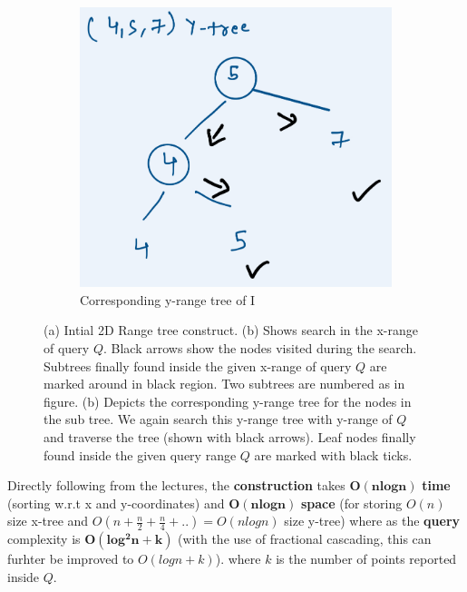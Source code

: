 \begin{figure}[H]
     \begin{subfigure}[b]{0.5\textwidth}
         \centering
         \includegraphics[width=\textwidth]{Images/yfin.jpg}
         \caption{Corresponding y-range tree of I}
         \label{fig:2dy}
     \end{subfigure}
        \caption{(a) Intial 2D Range tree construct. (b) Shows search in the x-range of query $Q$. Black arrows show the nodes visited during the search. Subtrees finally found inside the given x-range of query $Q$ are marked around in black region. Two subtrees are numbered as in figure. (b) Depicts the corresponding y-range tree for the nodes in the sub tree. We again search this y-range tree with y-range of $Q$ and traverse the tree (shown with black arrows).  Leaf nodes finally found inside the given query range $Q$ are marked with black ticks.}
        \label{fig:three graphs}
\end{figure}

Directly following from the lectures, the \textbf{construction} takes $\bm{O(nlogn)}$ \textbf{time} (sorting w.r.t x and y-coordinates) and $\bm{O(nlogn)}$ \textbf{space} (for storing $O(n)$ size x-tree and $O(n+\frac{n}{2}+\frac{n}{4}+..)=O(nlogn)$ size y-tree) where as the \textbf{query} complexity is $\bm{O(log^2{n}+k)}$ (with the use of fractional cascading, this can furhter be improved to $O(logn+k)$). where $k$ is the number of points reported inside $Q$.

\newpage
